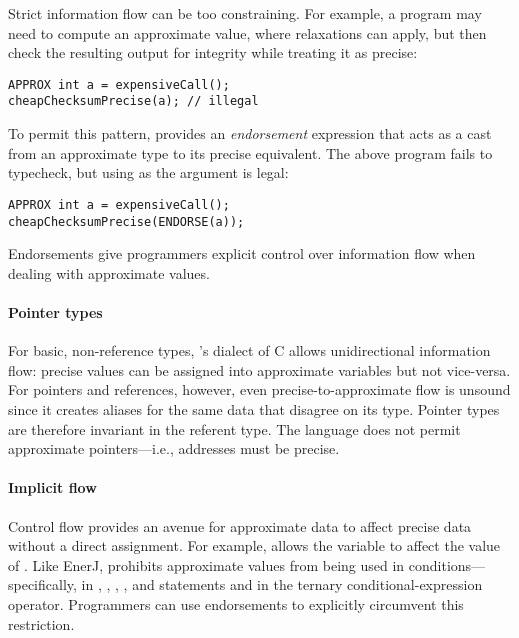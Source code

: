 Strict information flow can be too constraining.
For example, a program may need to
compute an approximate value, where relaxations can apply, but then check the
resulting output for integrity while treating it as precise:
%
\begin{lstlisting}
APPROX int a = expensiveCall();
cheapChecksumPrecise(a); // illegal
\end{lstlisting}
%
To permit this pattern, \sysname provides an \emph{endorsement} expression
that acts as a cast from an approximate type to its precise equivalent.
The above program fails to typecheck, but using  as the argument
is legal:
\begin{lstlisting}
APPROX int a = expensiveCall();
cheapChecksumPrecise(ENDORSE(a));
\end{lstlisting}
Endorsements give programmers explicit control over information flow
when dealing with approximate values.

\paragraph{Pointer types}
For basic, non-reference types, \sysname's dialect of C allows unidirectional
information flow: precise values can be assigned into approximate variables
but not vice-versa. For pointers and references, however,
even precise-to-approximate flow is unsound since
it creates aliases for the same data that disagree on its type.
Pointer types are therefore invariant in the referent type.
The language does not permit approximate pointers---i.e., addresses must be
precise.

\paragraph{Implicit flow}
Control flow provides an avenue for approximate data to affect precise data
without a direct assignment. For example,  allows the
variable  to affect the value of .
Like EnerJ, \sysname prohibits approximate values from being used in
conditions---specifically, in , , , , and
 statements and in the ternary conditional-expression operator.
Programmers can use endorsements to explicitly circumvent this restriction.

